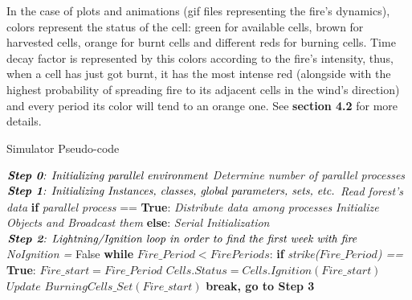 \documentclass[11pt]{article}
\begin{document}
\begin{itemize}
	In the case of plots and animations (gif files representing the fire's dynamics), colors represent the status of the cell: green for available cells, brown for harvested cells, orange for burnt cells and different reds for burning cells. Time decay factor is represented by this colors according to the fire's intensity, thus, when a cell has just got burnt, it has the most intense red (alongside with the highest probability of spreading fire to its adjacent cells in the wind's direction) and every period its color will tend to an orange one. See \textbf{section 4.2} for more details. 
	\end{itemize}

	
\begin{algorithm}
\caption{Simulator Pseudo-code}\label{SimSteps}
\begin{algorithmic}[1]
	\State $\textit{\textbf{Step 0}: Initializing parallel environment} $
		\State \hspace{1.0cm} \textit{Determine number of parallel processes}
	\State $\textit{\textbf{Step 1}: Initializing Instances, classes, global parameters, sets, etc.}$
	\State \hspace{1.0cm} \textit{Read forest's data}	
	\State \hspace{1.0cm} \textbf{if} \textit{parallel process} == \textbf{True}:
		\State \hspace{2.0cm} \textit{Distribute data among processes}
		\State \hspace{2.0cm} \textit{Initialize Objects and Broadcast them}
		\State \hspace{1.0cm} \textbf{else}:
		\State \hspace{2.0cm} \textit{Serial Initialization}
	\State $\textit{\textbf{Step 2}: Lightning/Ignition loop in order to find the first week with fire}$
	\State \hspace{1.0cm} \textit{NoIgnition =} False
	\State \hspace{1.0cm} \textbf{while} \textit{$Fire\_Period < FirePeriods$}: 	
		\State \hspace{2.0cm} \textbf{if} \textit{strike($Fire\_Period$) ==} \textbf{True}:
			\State \hspace{3.0cm} $Fire\_start = Fire\_Period$
			\State \hspace{3.0cm} $Cells.Status = Cells.Ignition(Fire\_start)$
			\State \hspace{3.0cm} $Update $ $BurningCells\_Set(Fire\_start)$ 
			\State \hspace{3.0cm} \textbf{break, go to Step 3}

\end{algorithmic}
\end{algorithm}
\end{document}
